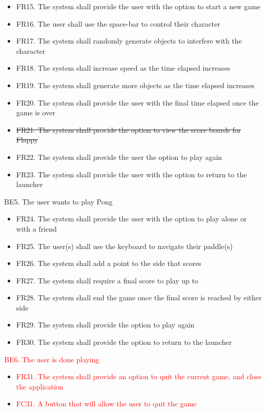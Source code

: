 \documentclass[12pt, titlepage]{article}
\begin{document}
    \begin{itemize}
        \item FR15. The system shall provide the user with the option to start a new game
        \item FR16. The user shall use the space-bar to control their character
        \item FR17. The system shall randomly generate objects to interfere with the character
        \item FR18. The system shall increase speed as the time elapsed increases
        \item FR19. The system shall generate more objects as the time elapsed increases
        \item FR20. The system shall provide the user with the final time elapsed once the game is over
        \item \sout{FR21. The system shall provide the option to view the score boards for Flappy}
        \item FR22. The system shall provide the user the option to play again
        \item FR23. The system shall provide the user with the option to return to the launcher
    \end{itemize}
    BE5. The user wants to play Pong
    \begin{itemize}
        \item FR24. The system shall provide the user with the option to play alone or with a friend
        \item FR25. The user(s) shall use the keyboard to navigate their paddle(s)
        \item FR26. The system shall add a point to the side that scores
        \item FR27. The system shall require a final score to play up to
        \item FR28. The system shall end the game once the final score is reached by either side
        \item FR29. The system shall provide the option to play again
        \item FR30. The system shall provide the option to return to the launcher
    \end{itemize}
    \textcolor{red}{BE6. The user is done playing}
    \begin{itemize}
        \item \textcolor{red}{FR31. The system shall provide an option to quit the current game, and close the application}
        \item \textcolor{red}{FC31. A button that will allow the user to quit the game}
    \end{itemize}
\end{document}
